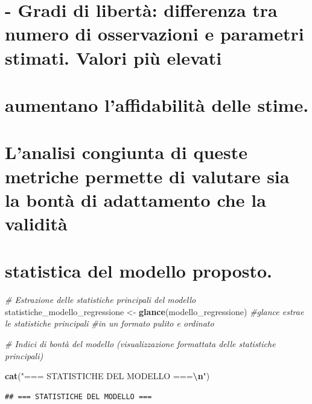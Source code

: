 \documentclass[
]{article}
\newenvironment{Shaded}{\begin{snugshade}}{\end{snugshade}}
\newcommand{\CommentTok}[1]{\textcolor[rgb]{0.56,0.35,0.01}{\textit{#1}}}
\newcommand{\DecValTok}[1]{\textcolor[rgb]{0.00,0.00,0.81}{#1}}
\newcommand{\FunctionTok}[1]{\textcolor[rgb]{0.13,0.29,0.53}{\textbf{#1}}}
\newcommand{\NormalTok}[1]{#1}
\newcommand{\OtherTok}[1]{\textcolor[rgb]{0.56,0.35,0.01}{#1}}
\newcommand{\SpecialCharTok}[1]{\textcolor[rgb]{0.81,0.36,0.00}{\textbf{#1}}}
\newcommand{\StringTok}[1]{\textcolor[rgb]{0.31,0.60,0.02}{#1}}
\begin{document}
\section{- Gradi di libertà: differenza tra numero di osservazioni e
parametri stimati. Valori più
elevati}\label{gradi-di-libertuxe0-differenza-tra-numero-di-osservazioni-e-parametri-stimati.-valori-piuxf9-elevati}

\section{aumentano l'affidabilità delle
stime.}\label{aumentano-laffidabilituxe0-delle-stime.}

\section{L'analisi congiunta di queste metriche permette di valutare sia
la bontà di adattamento che la
validità}\label{lanalisi-congiunta-di-queste-metriche-permette-di-valutare-sia-la-bontuxe0-di-adattamento-che-la-validituxe0}

\section{statistica del modello
proposto.}\label{statistica-del-modello-proposto.}

\begin{Shaded}
\begin{Highlighting}[]
\CommentTok{\# Estrazione delle statistiche principali del modello }
\NormalTok{statistiche\_modello\_regressione }\OtherTok{\textless{}{-}} \FunctionTok{glance}\NormalTok{(modello\_regressione) }\CommentTok{\#glance estrae le statistiche principali}
                                                               \CommentTok{\#in un formato pulito e ordinato }

\CommentTok{\# Indici di bontà del modello (visualizzazione formattata delle statistiche principali)}

\FunctionTok{cat}\NormalTok{(}\StringTok{"=== STATISTICHE DEL MODELLO ===}\SpecialCharTok{\textbackslash{}n}\StringTok{"}\NormalTok{)}
\end{Highlighting}
\end{Shaded}

\begin{verbatim}
## === STATISTICHE DEL MODELLO ===
\end{verbatim}

\begin{Shaded}
\end{Shaded}
\end{document}
